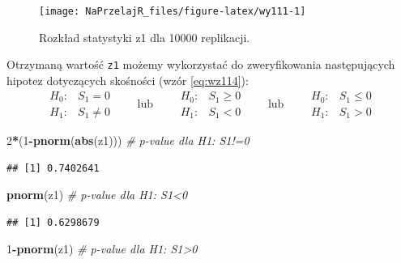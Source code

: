 \documentclass[polish,]{book}
\newenvironment{Shaded}{\begin{snugshade}}{\end{snugshade}}
\newcommand{\CommentTok}[1]{\textcolor[rgb]{0.56,0.35,0.01}{\textit{#1}}}
\newcommand{\DecValTok}[1]{\textcolor[rgb]{0.00,0.00,0.81}{#1}}
\newcommand{\KeywordTok}[1]{\textcolor[rgb]{0.13,0.29,0.53}{\textbf{#1}}}
\newcommand{\NormalTok}[1]{#1}
\newcommand{\OperatorTok}[1]{\textcolor[rgb]{0.81,0.36,0.00}{\textbf{#1}}}
\begin{document}
\begin{figure}[h]

{\centering \texttt{[image: NaPrzelajR\_files/figure-latex/wy111-1]} 

}

\caption{Rozkład statystyki z1 dla 10000 replikacji.}\label{fig:wy111}
\end{figure}

Otrzymaną wartość \texttt{z1} możemy wykorzystać do zweryfikowania następujących hipotez dotyczących skośności (wzór \eqref{eq:wz114}):
\[
\begin{array}{ll}
H_0: & S_1 = 0\\
H_1: & S_1 \neq 0
\end{array}
\qquad\text{lub}\qquad
\begin{array}{ll}
H_0: & S_1 \geq 0\\
H_1: & S_1 < 0
\end{array}
\qquad\text{lub}\qquad
\begin{array}{ll}
H_0: & S_1 \leq 0\\
H_1: & S_1 > 0
\end{array}
\]

\begin{Shaded}
\begin{Highlighting}[]
\DecValTok{2}\OperatorTok{*}\NormalTok{(}\DecValTok{1}\OperatorTok{-}\KeywordTok{pnorm}\NormalTok{(}\KeywordTok{abs}\NormalTok{(z1))) }\CommentTok{# p-value dla H1: S1!=0}
\end{Highlighting}
\end{Shaded}

\begin{verbatim}
## [1] 0.7402641
\end{verbatim}

\begin{Shaded}
\begin{Highlighting}[]
\KeywordTok{pnorm}\NormalTok{(z1)            }\CommentTok{# p-value dla H1: S1<0}
\end{Highlighting}
\end{Shaded}

\begin{verbatim}
## [1] 0.6298679
\end{verbatim}

\begin{Shaded}
\begin{Highlighting}[]
\DecValTok{1}\OperatorTok{-}\KeywordTok{pnorm}\NormalTok{(z1)          }\CommentTok{# p-value dla H1: S1>0}
\end{Highlighting}
\end{Shaded}
\end{document}
